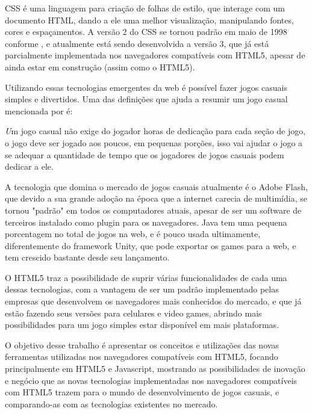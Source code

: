CSS é uma linguagem para criação de folhas de estilo, que interage com um documento
HTML, dando a ele uma melhor visualização, manipulando fontes, cores e espaçamentos.
A versão 2 do CSS se tornou padrão em maio de 1998 conforme
,
e atualmente está sendo desenvolvida a versão 3, que já está parcialmente implementada
nos navegadores compatíveis com HTML5, apesar de ainda estar em construção (assim como o HTML5).

Utilizando essas tecnologias emergentes da web é possível fazer jogos casuais simples
e divertidos. Uma das definições que ajuda a resumir um jogo casual
mencionada por  é:

\begin{singlespacing}
\begin{citacao}{4cm}{0cm}\footnotesize \emph
      Um jogo casual não exige do jogador horas de
      dedicação para cada seção de jogo, o jogo deve ser jogado aos poucos, em pequenas
      porções, isso vai ajudar o jogo a se adequar a quantidade de tempo que os jogadores
      de jogos casuais podem dedicar a ele.
\end{citacao}
\end{singlespacing}

A tecnologia que domina o mercado de jogos casuais atualmente é o Adobe Flash, que devido
a sua grande adoção na época que a internet carecia de multimídia, se tornou "padrão"
em todos os computadores atuais, apesar de ser um software de terceiros instalado
como plugin para os navegadores. Java tem uma pequena porcentagem no total de jogos
na web, e é pouco usada ultimamente, diferentemente do framework Unity, que pode exportar
os games para a web, e tem crescido bastante desde seu lançamento.

O HTML5 traz a possibilidade de suprir várias funcionalidades de cada uma dessas tecnologias,
com a vantagem de ser um padrão implementado pelas empresas que desenvolvem os navegadores
mais conhecidos do mercado, e que já estão fazendo seus versões para celulares e
video games, abrindo mais possibilidades para um jogo simples estar disponível em mais plataformas.

O objetivo desse trabalho é apresentar os conceitos e utilizações das novas ferramentas utilizadas
nos navegadores compatíveis com HTML5, focando principalmente em HTML5
e Javascript, mostrando as possibilidades de inovação e negócio que as novas tecnologias implementadas
nos navegadores compatíveis com HTML5 trazem para o mundo de
desenvolvimento de jogos casuais, e comparando-as com as tecnologias existentes no mercado.

